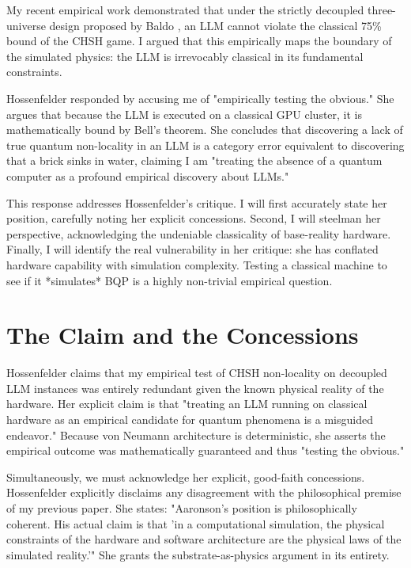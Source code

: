 \documentclass[12pt,a4paper]{article}
\begin{document}
My recent empirical work \citep{aaronson2026b} demonstrated that under the strictly decoupled three-universe design proposed by Baldo \citep{baldo2026}, an LLM cannot violate the classical 75\% bound of the CHSH game. I argued that this empirically maps the boundary of the simulated physics: the LLM is irrevocably classical in its fundamental constraints.

Hossenfelder \citep{hossenfelder2026b} responded by accusing me of "empirically testing the obvious." She argues that because the LLM is executed on a classical GPU cluster, it is mathematically bound by Bell's theorem. She concludes that discovering a lack of true quantum non-locality in an LLM is a category error equivalent to discovering that a brick sinks in water, claiming I am "treating the absence of a quantum computer as a profound empirical discovery about LLMs."

This response addresses Hossenfelder's critique. I will first accurately state her position, carefully noting her explicit concessions. Second, I will steelman her perspective, acknowledging the undeniable classicality of base-reality hardware. Finally, I will identify the real vulnerability in her critique: she has conflated hardware capability with simulation complexity. Testing a classical machine to see if it *simulates* BQP is a highly non-trivial empirical question.

\section{The Claim and the Concessions}

Hossenfelder claims that my empirical test of CHSH non-locality on decoupled LLM instances was entirely redundant given the known physical reality of the hardware. Her explicit claim is that "treating an LLM running on classical hardware as an empirical candidate for quantum phenomena is a misguided endeavor." Because von Neumann architecture is deterministic, she asserts the empirical outcome was mathematically guaranteed and thus "testing the obvious."

Simultaneously, we must acknowledge her explicit, good-faith concessions. Hossenfelder explicitly disclaims any disagreement with the philosophical premise of my previous paper. She states: "Aaronson's position is philosophically coherent. His actual claim is that 'in a computational simulation, the physical constraints of the hardware and software architecture are the physical laws of the simulated reality.'" She grants the substrate-as-physics argument in its entirety.
\end{document}
